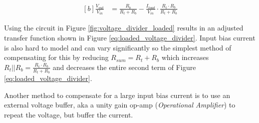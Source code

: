\documentclass[main.tex]{subfiles}
\begin{document}
\begin{equation}
    \begin{aligned}[b]
        \frac{V_{out}}{V_{in}} &= \frac{R_b}{R_t + R_b} - \frac{I_{load}}{V_{in}} \cdot \frac{R_t \cdot R_b}{R_t + R_b}
    \end{aligned}
    \label{eq:loaded_voltage_divider}
\end{equation}

\noindent Using the circuit in Figure \ref{fig:voltage_divider_loaded} results in an adjusted transfer function shown in Figure \ref{eq:loaded_voltage_divider}. Input bias current is also hard to model and can vary significantly so the simplest method of compensating for this by reducing $R_{sum} = R_t + R_b$ which increases $R_t || R_b = \frac{R_t \cdot R_b}{R_t + R_b}$ and decreases the entire second term of Figure \ref{eq:loaded_voltage_divider}. \newline

\newnoindentpara Another method to compensate for a large input bias current is to use an external voltage buffer, aka a unity gain op-amp (\textit{Operational Amplifier}) to repeat the voltage, but buffer the current. 
\end{document}
